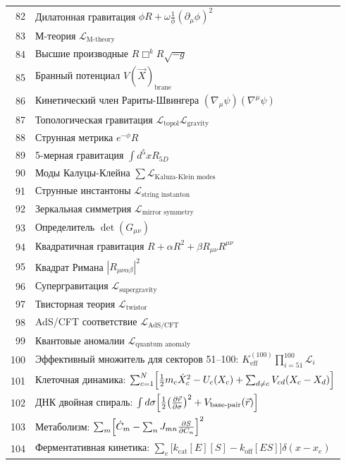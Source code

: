 \documentclass[12pt,a4paper]{article}
\begin{document}
\begin{longtable}{r l}
		82 & Дилатонная гравитация \(\phi R + \omega\frac{1}{\phi}(\partial_\mu\phi)^2\) \\
		83 & М-теория \(\mathcal{L}_{\text{M-theory}}\) \\
		84 & Высшие производные \(R\Box^k R\sqrt{-g}\) \\
		85 & Бранный потенциал \(V(\vec{X})_{\text{brane}}\) \\
		86 & Кинетический член Рариты-Швингера \((\nabla_\mu\psi)(\nabla^\mu\psi)\) \\
		87 & Топологическая гравитация \(\mathcal{L}_{\text{topol}}\mathcal{L}_{\text{gravity}}\) \\
		88 & Струнная метрика \(e^{-\phi}R\) \\
		89 & 5-мерная гравитация \(\int d^5x R_{5D}\) \\
		90 & Моды Калуцы-Клейна \(\sum\mathcal{L}_{\text{Kaluza-Klein modes}}\) \\
		91 & Струнные инстантоны \(\mathcal{L}_{\text{string instanton}}\) \\
		92 & Зеркальная симметрия \(\mathcal{L}_{\text{mirror symmetry}}\) \\
		93 & Определитель \(\det(G_{\mu\nu})\) \\
		94 & Квадратичная гравитация \(R + \alpha R^2 + \beta R_{\mu\nu}R^{\mu\nu}\) \\
		95 & Квадрат Римана \(|R_{\mu\nu\alpha\beta}|^2\) \\
		96 & Супергравитация \(\mathcal{L}_{\text{supergravity}}\) \\
		97 & Твисторная теория \(\mathcal{L}_{\text{twistor}}\) \\
		98 & AdS/CFT соответствие \(\mathcal{L}_{\text{AdS/CFT}}\) \\
		99 & Квантовые аномалии \(\mathcal{L}_{\text{quantum anomaly}}\) \\
		100 & Эффективный множитель для секторов 51--100: \(K^{(100)}_{\mathrm{eff}}\prod_{i=51}^{100}\mathcal{L}_i\) \\
		101 & Клеточная динамика: $\sum_{c=1}^{N}\Bigl[\frac12 m_c\dot X_c^2 - U_c(X_c) + \sum_{d\neq c}V_{cd}(X_c-X_d)\Bigr]$ \\
		102 & ДНК двойная спираль: $\int d\sigma\Bigl[\frac12\bigl(\frac{\partial\vec r}{\partial\sigma}\bigr)^2 + V_{\text{base-pair}}(\vec r)\Bigr]$ \\
		103 & Метаболизм: $\sum_m\Bigl[\dot C_m - \sum_n J_{mn}\frac{\partial S}{\partial C_n}\Bigr]^2$ \\
		104 & Ферментативная кинетика: $\sum_e\bigl[k_{\text{cat}}[E][S] - k_{\text{off}}[ES]\bigr]\delta(x-x_e)$ \\

\end{longtable}
\end{document}
